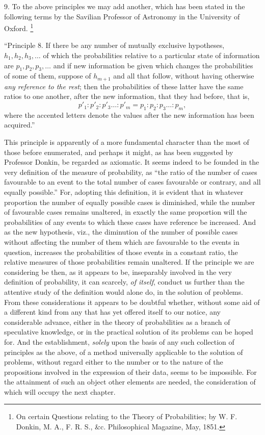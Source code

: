 \documentclass[oneside]{book}
\begin{document}
9. To the above principles we may add another, which has
been stated in the following terms by the Savilian Professor of
Astronomy in the University of Oxford.%
\footnote{On certain Questions relating to the Theory of Probabilities; by W. F.
Donkin, M. A., F. R. S., \&c. Philosophical Magazine, May, 1851.}

``Principle 8. If there be any number of mutually exclusive
hypotheses, $h_1, h_2, h_3,\dotsc$ of which the probabilities relative to a
particular state of information are $p_1, p_2, p_3,\dotsc$ and if new information
be given which changes the probabilities of some of them,
suppose of $h_{m+1}$ and all that follow, without having otherwise
\emph{any reference to the rest}; then the probabilities of these latter
have the same ratios to one another, after the new information,
that they had before, that is,
\[
  p'_1\colon p'_2\colon p'_3\ldots\colon p'_m
= p_1 \colon p_2 \colon p_3 \ldots\colon p_m,
\]
where the accented letters denote the values after the new information
has been acquired.''

This principle is apparently of a more fundamental character
than the most of those before enumerated, and perhaps it might, as
has been suggested by Professor Donkin, be regarded as axiomatic.
It seems indeed to be founded in the very definition of
the measure of probability, as ``the ratio of the number of cases
favourable to an event to the total number of cases favourable or
contrary, and all equally possible.'' For, adopting this definition,
it is evident that in whatever proportion the number of equally
possible cases is diminished, while the number of favourable cases
remains unaltered, in exactly the same proportion will the
probabilities of any events to which these cases have reference be
increased. And as the new hypothesis, viz., the diminution of
the number of possible cases without affecting the number of
them which are favourable to the events in question, increases
the probabilities of those events in a constant ratio, the relative
measures of those probabilities remain unaltered. If the principle
we are considering be then, as it appears to be, inseparably
involved in the very definition of probability, it can scarcely,
\emph{of itself}, conduct us further than the attentive study of
the definition would alone do, in the solution of problems. From these
considerations it appears to be doubtful whether, without some
aid of a different kind from any that has yet offered itself to our
notice, any considerable advance, either in the theory of
probabilities as a branch of speculative knowledge, or in the
practical solution of its problems can be hoped for. And the
establishment, \emph{solely} upon the basis of any such collection of principles as
the above, of a method universally applicable to the solution of
problems, without regard either to the number or to the nature
of the propositions involved in the expression of their data,
seems to be impossible. For the attainment of such an object
other elements are needed, the consideration of which will occupy
the next chapter.
\end{document}
